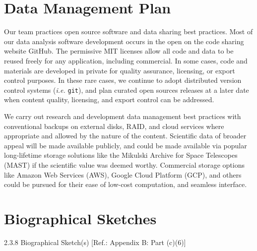 \documentclass[12pt]{article}
\begin{document}

\section*{Data Management Plan}


Our team practices open source software and data sharing best practices.  Most of our data analysis software development occurs in the open on the code sharing website GitHub.  The permissive MIT licenses allow all code and data to be reused freely for any application, including commercial.  In some cases, code and materials are developed in private for quality assurance, licensing, or export control purposes.  In these rare cases, we continue to adopt distributed version control systems (\emph{i.e.} \texttt{git}), and plan curated open sources releases at a later date when content quality, licensing, and export control can be addressed.

We carry out research and development data management best practices with conventional backups on external disks, RAID, and cloud services where appropriate and allowed by the nature of the content.  Scientific data of broader appeal will be made available publicly, and could be made available via popular long-lifetime storage solutions like the Mikulski Archive for Space Telescopes (MAST) if the scientific value was deemed worthy.  Commercial storage options like Amazon Web Services (AWS), Google Cloud Platform (GCP), and others could be pursued for their ease of low-cost computation, and seamless interface.




\cleardoublepage






\cleardoublepage

\section*{Biographical Sketches}
%
2.3.8 Biographical Sketch(s) [Ref.: Appendix B: Part (c)(6)]
\end{document}

